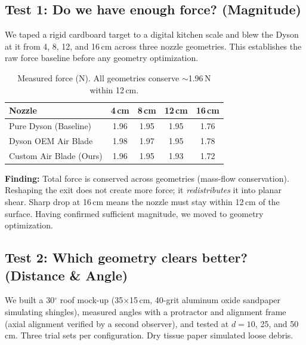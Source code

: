 \documentclass[12pt, letterpaper]{article}
\begin{document}
\subsection{Test 1: Do we have enough force? (Magnitude)}

We taped a rigid cardboard target to a digital kitchen scale and blew the Dyson at it from 4, 8, 12, and 16\,cm across three nozzle geometries. This establishes the raw force baseline before any geometry optimization.

\vspace{-2pt}
\begin{table}[H]
\centering\small
\caption{Measured force (N). All geometries conserve $\sim$1.96\,N within 12\,cm.}
\label{tab:force}
\begin{tabular}{@{}lcccc@{}}
\toprule
\textbf{Nozzle} & \textbf{4\,cm} & \textbf{8\,cm} & \textbf{12\,cm} & \textbf{16\,cm} \\
\midrule
Pure Dyson (Baseline)   & 1.96 & 1.95 & 1.95 & 1.76 \\
Dyson OEM Air Blade     & 1.98 & 1.97 & 1.95 & 1.78 \\
Custom Air Blade (Ours) & 1.96 & 1.95 & 1.93 & 1.72 \\
\bottomrule
\end{tabular}
\end{table}

\vspace{-4pt}
\textbf{Finding:} Total force is conserved across geometries (mass-flow conservation). Reshaping the exit does not create more force; it \textit{redistributes} it into planar shear. Sharp drop at 16\,cm means the nozzle must stay within 12\,cm of the surface. Having confirmed sufficient magnitude, we moved to geometry optimization.

\subsection{Test 2: Which geometry clears better? (Distance \& Angle)}

We built a 30$^\circ$ roof mock-up (35$\times$15\,cm, 40-grit aluminum oxide sandpaper simulating shingles), measured angles with a protractor and alignment frame (axial alignment verified by a second observer), and tested at $d = 10$, 25, and 50\,cm. Three trial sets per configuration. Dry tissue paper simulated loose debris.
\end{document}
